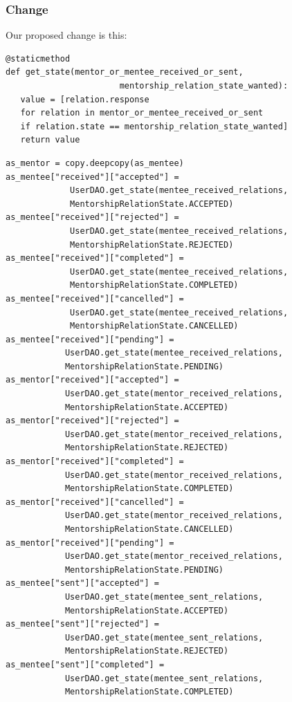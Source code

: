 \documentclass{article}
\begin{document}
\subsubsection{Change}
\hspace{0.5cm}Our proposed change is this:
\lstset{language=Python}
\begin{lstlisting}
@staticmethod
def get_state(mentor_or_mentee_received_or_sent, 
                       mentorship_relation_state_wanted):
   value = [relation.response
   for relation in mentor_or_mentee_received_or_sent
   if relation.state == mentorship_relation_state_wanted]
   return value
\end{lstlisting}
\lstset{language=Python}
\begin{lstlisting}
as_mentor = copy.deepcopy(as_mentee)
as_mentee["received"]["accepted"] = 
             UserDAO.get_state(mentee_received_relations, 
             MentorshipRelationState.ACCEPTED)
as_mentee["received"]["rejected"] = 
             UserDAO.get_state(mentee_received_relations, 
             MentorshipRelationState.REJECTED)
as_mentee["received"]["completed"] = 
             UserDAO.get_state(mentee_received_relations, 
             MentorshipRelationState.COMPLETED)
as_mentee["received"]["cancelled"] = 
             UserDAO.get_state(mentee_received_relations, 
             MentorshipRelationState.CANCELLED)
as_mentee["received"]["pending"] = 
            UserDAO.get_state(mentee_received_relations, 
            MentorshipRelationState.PENDING)
as_mentor["received"]["accepted"] = 
            UserDAO.get_state(mentor_received_relations, 
            MentorshipRelationState.ACCEPTED)
as_mentor["received"]["rejected"] = 
            UserDAO.get_state(mentor_received_relations, 
            MentorshipRelationState.REJECTED)
as_mentor["received"]["completed"] = 
            UserDAO.get_state(mentor_received_relations, 
            MentorshipRelationState.COMPLETED)
as_mentor["received"]["cancelled"] = 
            UserDAO.get_state(mentor_received_relations, 
            MentorshipRelationState.CANCELLED)
as_mentor["received"]["pending"] = 
            UserDAO.get_state(mentor_received_relations, 
            MentorshipRelationState.PENDING)
as_mentee["sent"]["accepted"] =
            UserDAO.get_state(mentee_sent_relations, 
            MentorshipRelationState.ACCEPTED)
as_mentee["sent"]["rejected"] = 
            UserDAO.get_state(mentee_sent_relations, 
            MentorshipRelationState.REJECTED)
as_mentee["sent"]["completed"] = 
            UserDAO.get_state(mentee_sent_relations, 
            MentorshipRelationState.COMPLETED)

\end{lstlisting}
\end{document}
